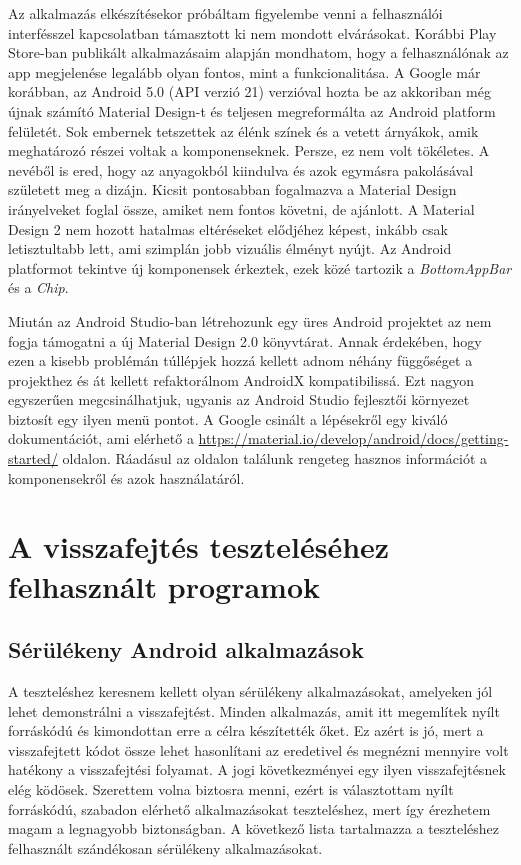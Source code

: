 \documentclass{thesis-ekf}
\theoremstyle{definition}
\theoremstyle{remark}
\begin{document}
Az alkalmazás elkészítésekor próbáltam figyelembe venni a felhasználói interfésszel kapcsolatban támasztott ki nem mondott elvárásokat.
Korábbi Play Store-ban publikált alkalmazásaim alapján mondhatom, hogy a felhasználónak az app megjelenése legalább olyan fontos, mint a funkcionalitása.
A Google már korábban, az Android 5.0 (API verzió 21) verzióval hozta be az akkoriban még újnak számító Material Design-t és teljesen megreformálta az Android platform felületét.
Sok embernek tetszettek az élénk színek és a vetett árnyákok, amik meghatározó részei voltak a komponenseknek. Persze, ez nem volt tökéletes.
A nevéből is ered, hogy az anyagokból kiindulva és azok egymásra pakolásával született meg a dizájn. 
Kicsit pontosabban fogalmazva a Material Design irányelveket foglal össze, amiket nem fontos követni, de ajánlott. 
A Material Design 2 nem hozott hatalmas eltéréseket elődjéhez képest, inkább csak letisztultabb lett, ami szimplán jobb vizuális élményt nyújt.
Az Android platformot tekintve új komponensek érkeztek, ezek közé tartozik a \emph{BottomAppBar} és a \emph{Chip}.

Miután az Android Studio-ban létrehozunk egy üres Android projektet az nem fogja támogatni a új Material Design 2.0 könyvtárat.
Annak érdekében, hogy ezen a kisebb problémán túllépjek hozzá kellett adnom néhány függőséget a projekthez és át kellett refaktorálnom AndroidX kompatibilissá.
Ezt nagyon egyszerűen megcsinálhatjuk, ugyanis az Android Studio fejlesztői környezet biztosít egy ilyen menü pontot.
A Google csinált a lépésekről egy kiváló dokumentációt, ami elérhető a \mbox{\url{https://material.io/develop/android/docs/getting-started/}} oldalon.
Ráadásul az oldalon találunk rengeteg hasznos információt a komponensekről és azok használatáról.

\chapter{A visszafejtés teszteléséhez felhasznált programok}\label{teszteles}

\section{Sérülékeny Android alkalmazások}

A teszteléshez keresnem kellett olyan sérülékeny alkalmazásokat, amelyeken jól lehet demonstrálni a visszafejtést.
Minden alkalmazás, amit itt megemlítek nyílt forráskódú és kimondottan erre a célra készítették őket.
Ez azért is jó, mert a visszafejtett kódot össze lehet hasonlítani az eredetivel és megnézni mennyire volt hatékony a visszafejtési folyamat.
A jogi következményei egy ilyen visszafejtésnek elég ködösek.
Szerettem volna biztosra menni, ezért is választottam nyílt forráskódú, szabadon elérhető alkalmazásokat teszteléshez, mert így érezhetem magam a legnagyobb biztonságban.
A következő lista tartalmazza a teszteléshez felhasznált szándékosan sérülékeny alkalmazásokat.
\end{document}

